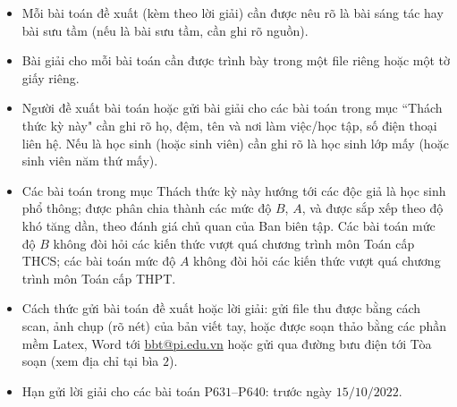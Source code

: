 \thispagestyle{thachthuctoanhocnone}
\pagestyle{thachthuctoanhoc}
\everymath{\color{thachthuctoanhoc}}
\graphicspath{{../thachthuctoanhoc/pic/}}
\begingroup
{}
\centering
\vspace*{4cm}
\endgroup
\vspace*{-8pt}
\begin{tBox}
	\begin{itemize}[leftmargin = 13pt, itemsep = 1.0pt] 
		\item Mỗi bài toán đề xuất (kèm theo lời giải) cần được nêu rõ là bài sáng tác hay bài sưu tầm (nếu là bài sưu tầm, cần ghi rõ nguồn).
		\item Bài giải cho mỗi bài toán cần được trình bày trong một file riêng hoặc
		một tờ giấy riêng.
		\item  Người đề xuất bài toán hoặc gửi bài giải cho các bài toán trong mục ``Thách thức kỳ này" cần ghi rõ họ, đệm, tên và nơi làm việc/học tập, số điện thoại liên hệ. Nếu là học sinh (hoặc sinh viên) cần ghi rõ là học sinh lớp mấy (hoặc sinh viên năm thứ mấy).
		\item Các bài toán trong mục Thách thức kỳ này hướng tới các độc giả là học sinh phổ thông; được phân chia thành các mức độ $B$, $A$, và được sắp xếp theo độ khó tăng dần, theo đánh giá chủ quan của Ban biên tập. Các bài toán mức độ $B$ không đòi hỏi các kiến thức vượt quá chương trình môn Toán cấp THCS; các bài toán mức độ $A$ không đòi hỏi các kiến thức vượt quá chương trình môn Toán cấp THPT.
		\item Cách thức gửi bài toán đề xuất hoặc lời giải: gửi file thu được bằng cách scan, ảnh chụp (rõ nét) của bản viết tay, hoặc được soạn thảo bằng các phần mềm Latex, Word tới \url{bbt@pi.edu.vn} hoặc gửi qua đường bưu điện tới Tòa soạn (xem địa chỉ tại bìa $2$).
		\item Hạn gửi lời giải cho các bài toán P$631$--P$640$: trước ngày $15/10/2022$.
	\end{itemize}
\end{tBox}
